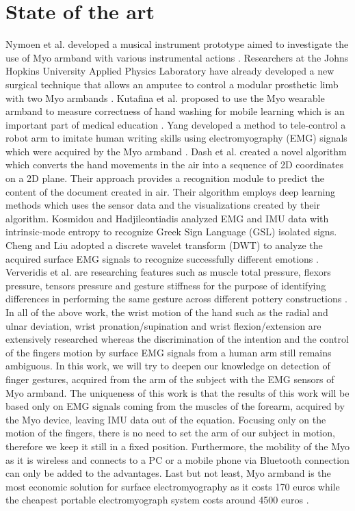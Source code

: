 \section{State of the art}
Nymoen et al. developed a musical instrument prototype aimed to investigate the use of Myo armband with various instrumental actions \cite{nymoen_mumyoevaluating_2015}. Researchers at the Johns Hopkins University Applied Physics Laboratory  have already developed a new surgical technique that allows an amputee to control a modular prosthetic limb with two Myo armbands \cite{myo_arm}. Kutafina et al. proposed to use the Myo wearable armband to measure correctness of hand washing for mobile learning which is an important part of medical education \cite{kutafina_wearable_2015}. Yang  developed a method to tele-control a robot arm to imitate human writing skills using electromyography (EMG) signals which were acquired by the Myo armband \cite{yang2015teleoperated}. Dash et al. created a novel algorithm which converts the hand movements in the air into a sequence of 2D coordinates on a 2D plane\cite{dash_airscript-creating_2017}. Their approach provides a recognition module to predict the content of the document created in air. Their algorithm employs deep learning methods which uses the sensor data and the visualizations created by their algorithm. Kosmidou and Hadjileontiadis  analyzed EMG and IMU data with intrinsic-mode entropy to recognize Greek Sign Language (GSL) isolated signs\cite{kosmidou_sign_2009}. Cheng and Liu adopted a discrete wavelet transform (DWT) to analyze the acquired surface EMG signals to recognize successfully different emotions \cite{cheng_emotion_2008}. Ververidis et al. are researching features such as muscle total pressure, flexors pressure, tensors pressure and gesture stiffness for the purpose of identifying differences in performing the same gesture across different pottery constructions \cite{ververidis_pottery_2016}.\\ 
In all of the above work, the wrist motion of the hand such as the radial and ulnar deviation, wrist pronation/supination and wrist flexion/extension are extensively researched whereas the discrimination of the intention and the control of the fingers motion by surface EMG signals from a human arm still remains ambiguous. In this work, we will try to deepen our knowledge on detection of finger gestures, acquired from the arm of the subject with the EMG sensors of Myo armband. The uniqueness of this work is that  the results of this work will be based only on EMG signals coming from the muscles of the forearm, acquired by the Myo device, leaving \ac{IMU} data out of the equation. Focusing only on the motion of the fingers, there is no need to set the arm of our subject in motion, therefore we keep it still in a fixed position. Furthermore, the mobility of the Myo as it is wireless and connects to a PC or a mobile phone via Bluetooth connection can only be added to the advantages. Last but not least, Myo armband is the most economic solution for surface electromyography as it costs 170 euros while the cheapest portable electromyograph system costs around 4500 euros \cite{EMG_device_price}.\\

